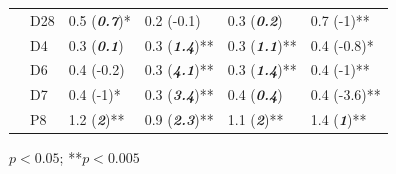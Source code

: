 \documentclass[journal = esthag, manuscript = article]{achemso}\usepackage[]{graphicx}\usepackage[]{color}
\begin{document}
\begin{table}[!tbp]
\begin{center}
\begin{tabular}{lllll}
~~D28&0.5 \footnotesize{(\textit{\textbf{0.7}})*}&0.2 \footnotesize{(-0.1)}&0.3 \footnotesize{(\textit{\textbf{0.2}})}&0.7 \footnotesize{(-1)**}\tabularnewline
~~D4&0.3 \footnotesize{(\textit{\textbf{0.1}})}&0.3 \footnotesize{(\textit{\textbf{1.4}})**}&0.3 \footnotesize{(\textit{\textbf{1.1}})**}&0.4 \footnotesize{(-0.8)*}\tabularnewline
~~D6&0.4 \footnotesize{(-0.2)}&0.3 \footnotesize{(\textit{\textbf{4.1}})**}&0.3 \footnotesize{(\textit{\textbf{1.4}})**}&0.4 \footnotesize{(-1)**}\tabularnewline
~~D7&0.4 \footnotesize{(-1)*}&0.3 \footnotesize{(\textit{\textbf{3.4}})**}&0.4 \footnotesize{(\textit{\textbf{0.4}})}&0.4 \footnotesize{(-3.6)**}\tabularnewline
~~P8&1.2 \footnotesize{(\textit{\textbf{2}})**}&0.9 \footnotesize{(\textit{\textbf{2.3}})**}&1.1 \footnotesize{(\textit{\textbf{2}})**}&1.4 \footnotesize{(\textit{\textbf{1}})**}\tabularnewline
\hline
\end{tabular}\end{center}

\footnotesize *$p<0.05$; **$p<0.005$\end{table}
\end{document}
